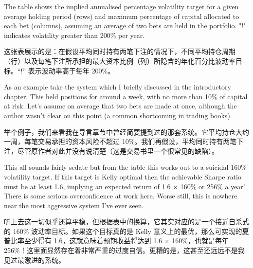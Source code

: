 \begin{englishblock} The table shows the implied annualised percentage volatility target for a given average holding period (rows) and maximum percentage of capital allocated to each bet (columns), assuming an average of two bets are held in the portfolio. "!" indicates volatility greater than 200\% per year. \end{englishblock}

\begin{chineseblock}这张表展示的是：在假设平均同时持有两笔下注的情况下，不同平均持仓周期（行）以及每笔下注所承担的最大资本比例（列）所隐含的年化百分比波动率目标。“!” 表示波动率高于每年 200\%。 \end{chineseblock}

\bipairgap

\begin{englishblock} As an example take the system which I briefly discussed in the introductory chapter. This held positions for around a week, with no more than 10\% of capital at risk. Let's assume on average that two bets are made at once, although the author wasn't clear on this point (a common shortcoming in trading books). \end{englishblock}

\begin{chineseblock}举个例子，我们来看我在导言章节中曾经简要提到过的那套系统。它平均持仓大约一周，每笔交易承担的资本风险不超过 10\%。我们再假设，平均同时持有两笔下注，尽管原作者对此并没有说清楚（这是交易书里一个很常见的缺陷）。\end{chineseblock}

\bipairgap

\begin{englishblock} This all sounds fairly sedate but from the table this works out to a suicidal 160\% volatility target. If this target is Kelly optimal then the achievable Sharpe ratio must be at least 1.6, implying an expected return of 1.6 × 160\% or 256\% a year! There is some serious overconfidence at work here. Worse still, this is nowhere near the most aggressive system I've ever seen. \end{englishblock}

\begin{chineseblock}听上去这一切似乎还算平稳，但根据表中的换算，它其实对应的是一个接近自杀式的 160\% 波动率目标。如果这个目标真的是 Kelly 意义上的最优，那么可实现的夏普比率至少得有 1.6，这就意味着预期收益将达到 1.6 × 160\%，也就是每年 256\%！这里面显然存在着非常严重的过度自信。更糟的是，这甚至还远远不是我见过最激进的系统。\end{chineseblock}

